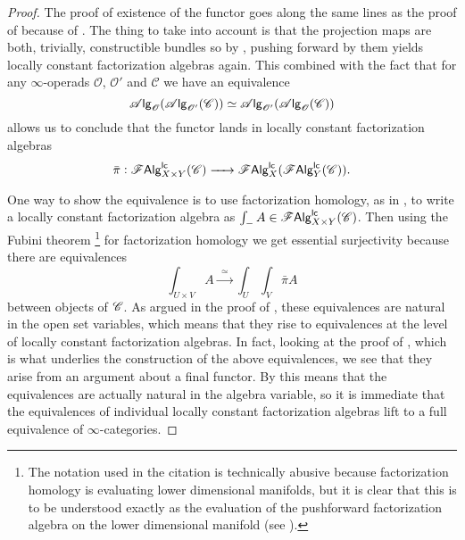 \documentclass[../text]{subfiles}
\begin{document}
\begin{proof}
    The proof of existence of the functor goes along the same lines as the proof of  because of . The thing to take into account is that the projection maps are both, trivially, constructible bundles so by , pushing forward by them yields locally constant factorization algebras again. This combined with the fact that for any $\infty$-operads $\mathscr{O}$, $\mathscr{O}'$ and $\mathscr{C}$ we have an equivalence
    \begin{equation}
        \mathscr{A} \mathsf{lg}_{\mathscr{O}} (\mathscr{A} \mathsf{lg}_{\mathscr{O}'} (\mathscr{C})) \simeq \mathscr{A} \mathsf{lg}_{\mathscr{O}'} (\mathscr{A} \mathsf{lg}_{\mathscr{O}} (\mathscr{C}))
    \end{equation}
    allows us to conclude that the functor lands in locally constant factorization algebras
    \begin{equation}
        \bar{\pi}: \mathscr{F} \mathsf{Alg}^{\mathsf{lc}}_{X \times Y}(\mathscr{C}) \xrightarrow{\ \ \ \ } \mathscr{F} \mathsf{Alg}^{\mathsf{lc}}_{X}(\mathscr{F} \mathsf{Alg}^{\mathsf{lc}}_{Y}(\mathscr{C})).
    \end{equation}

    One way to show the equivalence is to use factorization homology, as in , to write a locally constant factorization algebra as $\int_{-} A \in \mathscr{F} \mathsf{Alg}^{\mathsf{lc}}_{X \times Y} (\mathscr{C})$. Then using the Fubini theorem \cite[cor.2.29]{aft_fhstrat}\footnote{The notation used in the citation is technically abusive because factorization homology is evaluating lower dimensional manifolds, but it is clear that this is to be understood exactly as the evaluation of the pushforward factorization algebra on the lower dimensional manifold (see ).} for factorization homology we get essential surjectivity because there are equivalences
    \begin{equation}
        \int_{U \times V} A \xrightarrow{\ \ \simeq \ \ } \int_U \int_V \bar{\pi} A
    \end{equation}
    between objects of $\mathscr{C}$. As argued in the proof of , these equivalences are natural in the open set variables, which means that they rise to equivalences at the level of locally constant factorization algebras. In fact, looking at the proof of \cite[thm.2.25]{aft_fhstrat}, which is what underlies the construction of the above equivalences, we see that they arise from an argument about a final functor. By  this means that the equivalences are actually natural in the algebra variable, so it is immediate that the equivalences of individual locally constant factorization algebras lift to a full equivalence of $\infty$-categories.
\end{proof}
\end{document}
